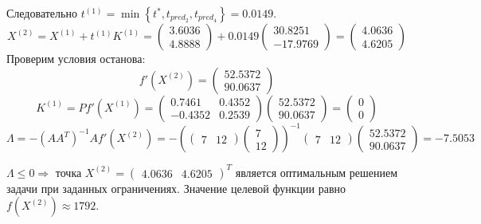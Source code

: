 Следовательно $t^{(1)} = \min \left\{ t^*, t_{pred_2}, t_{pred_4} \right\} = 0.0149$.
\begin{equation*}
X^{(2)} = X^{(1)} + t^{(1)} K^{(1)} = \begin{pmatrix} 3.6036 \\ 4.8888 \end{pmatrix} + 0.0149 \begin{pmatrix} 30.8251 \\ -17.9769 \end{pmatrix} = \begin{pmatrix} 4.0636 \\ 4.6205 \end{pmatrix}
\end{equation*}
Проверим условия останова:
\begin{equation*}
f'(X^{(2)}) = \begin{pmatrix} 52.5372 \\ 90.0637 \end{pmatrix}
\end{equation*}
\begin{equation*}
K^{(1)} = P f'(X^{(1)}) = \begin{pmatrix} 0.7461 & 0.4352 \\ -0.4352 & 0.2539 \end{pmatrix} \begin{pmatrix} 52.5372 \\ 90.0637 \end{pmatrix} = \begin{pmatrix} 0 \\ 0 \end{pmatrix}
\end{equation*}
\begin{equation*}
\Lambda = -\left(A A^T\right)^{-1} A f'(X^{(2)}) =
-\left( \begin{pmatrix} 7 & 12 \end{pmatrix} \begin{pmatrix} 7 \\ 12 \end{pmatrix}\right)^{-1} \begin{pmatrix} 7 & 12 \end{pmatrix} \begin{pmatrix} 52.5372 \\ 90.0637 \end{pmatrix} = -7.5053
\end{equation*}

$\Lambda \leq 0 \Rightarrow$ точка $X^{(2)} = \begin{pmatrix} 4.0636 & 4.6205 \end{pmatrix}^T$ является оптимальным решением задачи при заданных ограничениях. Значение целевой функции равно $f(X^{(2)}) \approx 1792$.

